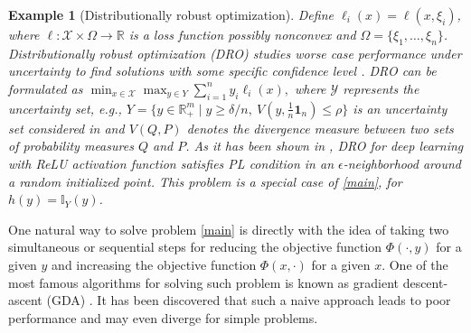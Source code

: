 \documentclass[letterpaper,11 pt]{article}
\newtheorem{example}{Example}
\newcommand{\afj}[1]{{\color{black}#1}}
\begin{document}
\begin{example}[Distributionally robust optimization]\label{ex1}\emph{
 Define $\ell_i(x)=\ell(x,\xi_i)$, where $\ell:\mathcal X\times \Omega\to\mathbb R$ is a loss function possibly nonconvex and $\Omega=\{\xi_1,\hdots,\xi_n\}$. Distributionally robust optimization (DRO) studies worse case performance under uncertainty to find solutions with some specific confidence level \cite{namkoong2016stochastic}. DRO can be formulated as $\min_{x\in \mathcal X}\max_{y\in  Y} \sum_{i=1}^n y_i \ell_i(x),$
where $\mathcal Y$ represents the uncertainty set, e.g., $ Y=\{y\in \mathbb R^m_{+}\mid y\geq \delta/n, \ V(y,\tfrac{1}{n}\mathbf 1_n)\leq \rho\}$ is an uncertainty set considered in \cite{namkoong2016stochastic} and $V (Q,P)$ denotes the divergence measure between two sets of probability measures $Q$ and $P$. As it has been shown in \cite{guo2020fast}, DRO for deep learning with ReLU activation function satisfies PL condition in an $\epsilon$-neighborhood around a random initialized point. This problem is a special case of \eqref{main}, for $h(y)=\mathbb I_{Y}(y)$.}
\end{example}
One natural way to solve problem \eqref{main} is directly with the idea of taking two simultaneous or sequential steps for reducing the objective function $\Phi(\cdot,y)$ for a given $y$ and increasing the objective function $\Phi(x,\cdot)$ for a given $x$. One of the most famous algorithms for solving such problem is known as gradient descent-ascent (GDA) \cite{nedic2009subgradient}.
It has been discovered that such a naive approach leads to poor performance and may even diverge for  simple problems.
\end{document}
